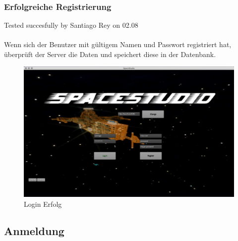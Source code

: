 \documentclass[12pt]{article}
\begin{document}
\subsubsection{Erfolgreiche Registrierung}
Tested succesfully by Santiago Rey on 02.08\\\\
Wenn sich der Benutzer mit gültigem Namen und Passwort registriert hat, überprüft der Server die Daten und speichert diese in der Datenbank.\\

\begin{figure}[h]
\centering
\includegraphics[scale=0.4]{TestProtocolBilder/erfolgLogin.jpg}
\caption{Login Erfolg}
\end{figure}
\newpage
\subsection{Anmeldung}
\end{document}
